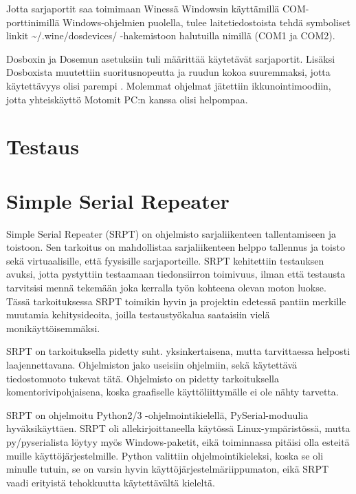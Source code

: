 Jotta sarjaportit saa toimimaan Winessä Windowsin käyttämillä COM-porttinimillä Windows-ohjelmien puolella, tulee laitetiedostoista tehdä symboliset linkit \textasciitilde{}/.wine/dosdevices/ -hakemistoon halutuilla nimillä (COM1 ja COM2).\cite[s. 21]{wine:manual}

Dosboxin ja Dosemun asetuksiin tuli määrittää käytetävät sarjaportit. Lisäksi Dosboxista muutettiin suoritusnopeutta ja ruudun kokoa suuremmaksi, jotta käytettävyys olisi parempi \cite{dosbox:conf}. Molemmat ohjelmat jätettiin ikkunointimoodiin, jotta yhteiskäyttö Motomit PC:n kanssa olisi helpompaa.

\section{Testaus}

\section{Simple Serial Repeater}

Simple Serial Repeater (SRPT) on ohjelmisto sarjaliikenteen tallentamiseen ja toistoon. Sen tarkoitus on mahdollistaa sarjaliikenteen helppo tallennus ja toisto sekä virtuaalisille, että fyysisille sarjaporteille. SRPT kehitettiin testauksen avuksi, jotta pystyttiin testaamaan tiedonsiirron toimivuus, ilman että testausta tarvitsisi mennä tekemään joka kerralla työn kohteena olevan moton luokse. Tässä tarkoituksessa SRPT toimikin hyvin ja projektin edetessä pantiin merkille muutamia kehitysideoita, joilla testaustyökalua saataisiin vielä monikäyttöisemmäksi.

SRPT on tarkoituksella pidetty suht. yksinkertaisena, mutta tarvittaessa helposti laajennettavana. Ohjelmiston jako useisiin ohjelmiin, sekä käytettävä tiedostomuoto tukevat tätä. Ohjelmisto on pidetty tarkoituksella komentorivipohjaisena, koska graafiselle käyttöliittymälle ei ole nähty tarvetta.

SRPT on ohjelmoitu Python2/3 -ohjelmointikielellä, PySerial-moduulia hyväksikäyttäen. SRPT oli allekirjoittaneella käytössä Linux-ympäristössä, mutta py/pyserialista löytyy myös Windows-paketit, eikä toiminnassa pitäisi olla esteitä muille käyttöjärjestelmille. Python valittiin ohjelmointikieleksi, koska se oli minulle tutuin, se on varsin hyvin käyttöjärjestelmäriippumaton, eikä SRPT vaadi erityistä tehokkuutta käytettävältä kieleltä.

